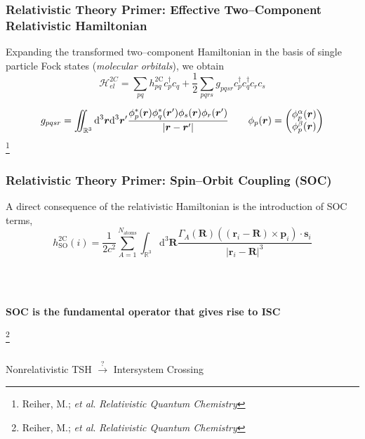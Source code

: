 \documentclass[usepdftitle=false,10pt]{beamer}
\newcommand*\vc[1]{\boldsymbol{#1}}
\newcommand*\op[1]{\mathcal{#1}}
\renewcommand*\iint[0]{\int\hspace{-8pt}\int}
\newcommand\blfootnote[1]{%
  \begingroup
  \renewcommand\thefootnote{}\footnote{#1}%
  \addtocounter{footnote}{-1}%
  \endgroup
}
\begin{document}
\begin{frame}
  \frametitle{Relativistic Theory Primer: Effective Two--Component Relativistic
  Hamiltonian}

  Expanding the transformed two--component Hamiltonian in the basis of single
  particle Fock states (\emph{molecular orbitals}), we obtain
  \begin{equation*}
    \op{H}^{2C}_{el} = \sum_{pq}h^\mathrm{2C}_{pq} c_p^\dagger c_q +
    \frac{1}{2}\sum_{pqrs} g_{pqsr}c_p^\dagger c_q^\dagger c_r c_s
  \end{equation*}

  \begin{equation*}
    g_{pqsr} = \iint_{\mathbb{R}^3}\mathrm{d}^3\vc{r} \mathrm{d}^3\vc{r}'
      \frac{\phi^*_p(\vc{r})\phi^*_q(\vc{r}')\phi_s(\vc{r})\phi_r(\vc{r}')}
           {\vert \vc{r} - \vc{r}' \vert} \qquad 
    \phi_p(\vc{r}) = 
      \begin{pmatrix} \phi^\alpha_p(\vc{r}) \\ \phi^\beta_p(\vc{r}) \end{pmatrix}
  \end{equation*}
  \blfootnote{\tiny Reiher, M.; \emph{et al}. \emph{Relativistic Quantum Chemistry}}

\end{frame}

\begin{frame}
  \frametitle{Relativistic Theory Primer: Spin--Orbit Coupling (SOC)}

  A direct consequence of the relativistic Hamiltonian is the introduction of SOC terms,
  \begin{equation*}
    h^\mathrm{2C}_\mathrm{SO} (i) = \frac{1}{2c^2} \sum_{A=1}^{N_\mathrm{atoms}}
      \int_{\mathbb{R}^3}\mathrm{d}^3\vc{R}
      \frac{\Gamma_A(\vc{R})
        (( \vc{r}_i - \vc{R} ) \times \vc{p}_i)\cdot \vc{s}_i}
	{\vert \vc{r}_i - \vc{R} \vert^3}
  \end{equation*}

  ~\\
  ~\\
  \begin{center}
  {\LARGE \bf SOC is the fundamental operator that gives rise to ISC}
  \end{center}
  \blfootnote{\tiny Reiher, M.; \emph{et al}. \emph{Relativistic Quantum Chemistry}}
\end{frame}

\begin{frame}
\frametitle{}
\begin{center}
{\LARGE
  Nonrelativistic TSH $\xrightarrow{?}$ Intersystem Crossing
}
\end{center}
\end{frame}
\end{document}
